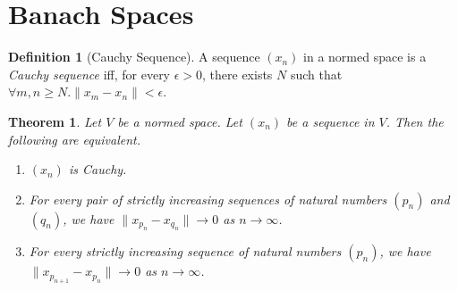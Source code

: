 \documentclass{book}
\newtheorem{thm}[ax]{Theorem}
\theoremstyle{definition}
\newtheorem{df}[ax]{Definition}
\begin{document}
\section{Banach Spaces}

\begin{df}[Cauchy Sequence]
A sequence $(x_n)$ in a normed space is a \emph{Cauchy sequence} iff, for every $\epsilon > 0$, there exists $N$ such that $\forall m,n \geq N. \| x_m - x_n \| < \epsilon$.
\end{df}

\begin{thm}
\label{thm:Cauchy}
Let $V$ be a normed space. Let $(x_n)$ be a sequence in $V$. Then the following are equivalent.
\begin{enumerate}
\item $(x_n)$ is Cauchy.
\item For every pair of strictly increasing sequences of natural numbers $(p_n)$ and $(q_n)$, we have $\| x_{p_n} - x_{q_n} \| \rightarrow 0$ as $n \rightarrow \infty$.
\item For every strictly increasing sequence of natural numbers $(p_n)$, we have $\| x_{p_{n+1}} - x_{p_n} \| \rightarrow 0$ as $n \rightarrow \infty$.
\end{enumerate}
\end{thm}
\end{document}

